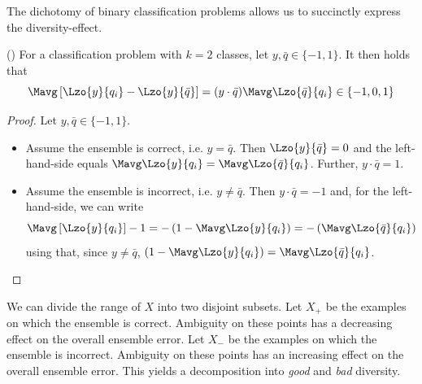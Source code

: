 \documentclass[../main.tex]{subfiles}
\begin{document}
The dichotomy of binary classification problems allows us to succinctly express the diversity-effect.
\begin{lemma} (\cite{brown_GoodBadDiversity_2010})
For a classification problem with $k=2$ classes, let $y, \bar{q} \in \{ -1, 1 \}$. It then holds that
$$
\Mavg \left[\Lzo{y}{q_{i}} - \Lzo{y}{\bar{q}}\right] 
= (y \cdot \bar{q}) \Mavg \Lzo{\bar{q}}{q_{i}} \in \{-1, 0, 1\}
$$
\end{lemma}
\begin{proof} Let $y, \bar{q} \in \{ -1, 1 \}$.
\begin{itemize}
\item Assume the ensemble is correct, i.e. $y=\bar{q}$. Then $\Lzo{y}{\bar{q}} = 0$ and the left-hand-side equals $\Mavg\Lzo{y}{q_{i}} = \Mavg\Lzo{\bar{q}}{q_{i}}$. Further, $y \cdot \bar{q} = 1$.
\item Assume the ensemble is incorrect, i.e. $y \not= \bar{q}$. Then $y \cdot \bar{q} = -1$ and, for the left-hand-side, we can write
$$
\Mavg \left[\Lzo{y}{q_{i}}\right] - 1 = - \left(1 - \Mavg \Lzo{y}{q_{i}}\right) = - \left(\Mavg \Lzo{\bar{q}}{q_{i}} \right)
$$
using that, since $y \not= \bar{q}$, $\left(  1 - \Mavg \Lzo{y}{q_{i}}\right) = \Mavg \Lzo{\bar{q}}{q_{i}}$.
\end{itemize}
\end{proof}

We can divide the range of $X$ into two disjoint subsets. Let $X_{+}$ be the examples on which the ensemble is correct. Ambiguity on these points has a decreasing effect on the overall ensemble error. Let $X_{-}$ be the examples on which the ensemble is incorrect. Ambiguity on these points has an increasing effect on the overall ensemble error. This yields a decomposition into \textit{good} and \textit{bad} diversity.
\end{document}
